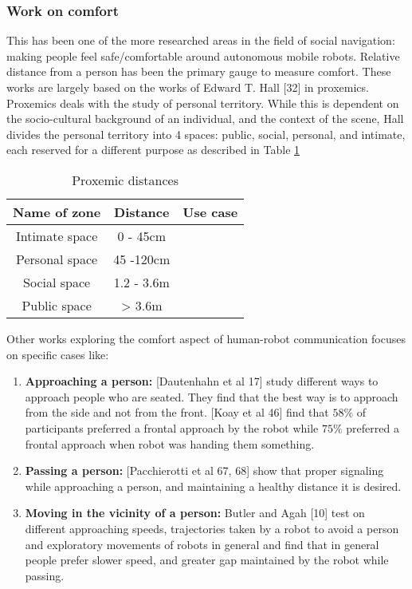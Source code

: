 \subsubsection{Work on comfort}
This has been one of the more researched areas in the field of social navigation: making people feel safe/comfortable around autonomous mobile robots. Relative distance from a person has been the primary gauge to measure comfort. These works are largely based on the works of Edward T. Hall [32] in proxemics. Proxemics deals with the study of personal territory. While this is dependent on the socio-cultural background of an individual, and the context of the scene, Hall divides the personal territory into 4 spaces: public, social, personal, and intimate, each reserved for a different purpose as described in Table \ref{tab:proxemics}
\begin{table}
	\label{tab:proxemics}
	\caption{Proxemic distances}
	\begin{center}
		\renewcommand{\arraystretch}{1.3}
		\begin{tabular}{|c|c|c|}
			\hline
			Name of zone & Distance & Use case \\
			\hline\hline
			Intimate space & 0 - 45cm & \\
			Personal space & 45 -120cm & \\
			Social space & 1.2 - 3.6m & \\
			Public space & > 3.6m & \\
			\hline
		\end{tabular}
	\end{center}
\end{table}
Other works exploring the comfort aspect of human-robot communication focuses on specific cases like:
\begin{enumerate}
	\item \textbf{Approaching a person:} [Dautenhahn et al 17] study different ways to approach people who are seated. They find that the best way is to approach from the side and not from the front.
	[Koay et al 46]  find that $58\%$ of participants preferred a frontal approach by the robot while $75\%$ preferred a frontal approach when robot was handing them something.
	\item \textbf{Passing a person:} [Pacchierotti et al 67, 68] show that proper signaling while approaching a person, and maintaining a healthy distance it is desired.
	\item \textbf{Moving in the vicinity of a person:}  Butler and Agah [10] test on different approaching speeds, trajectories taken by a robot to avoid a person and exploratory movements of robots in general and find that in general people prefer slower speed, and greater gap maintained by the robot while passing.
\end{enumerate}

